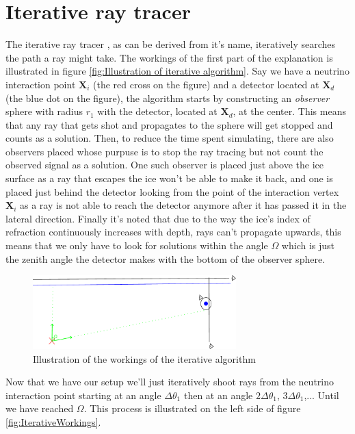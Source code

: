 \documentclass[11pt,a4paper,faculty=we,language=en,doctype=report]{cls/ugent-doc}
\begin{document}
\section{Iterative ray tracer}
\label{sec:Iterative}
The iterative ray tracer \cite{2022icrc.confE1027O}, as can be derived from
it's name, iteratively searches the path a ray might take. The workings of the
first part of the explanation is illustrated in figure \ref{fig:Illustration of
iterative algorithm}.  Say we have a neutrino interaction point $\mathbf{X}_i$
(the red cross on the figure) and a detector located at $\mathbf{X}_d$ (the
blue dot on the figure), the algorithm starts by constructing an
\textit{observer} sphere with radius $r_1$ with the detector, located at $\mathbf{X}_d$, at the
center.  This means that any ray that gets shot and propagates to the sphere
will get stopped and counts as a solution.  Then, to reduce the time spent simulating, there are also observers placed
whose purpuse is to stop the ray tracing but not count the observed signal as a solution.
One such observer is placed 
just above the ice surface as a ray that escapes the ice won't be able to make it back, and one
is placed just behind the detector looking from the point of the interaction vertex $\mathbf{X}_i$ as
a ray is not able to reach the detector anymore after it has passed it in the
lateral direction. Finally it's noted that due to the way the ice's index of refraction
continuously increases with depth, rays can't propagate upwards, this means that we only 
have to look for solutions within the angle $\Omega$ which is just the zenith angle the detector
makes with the bottom of the observer sphere.
\begin{figure}
  \centering
  \includegraphics[width=0.7\textwidth]{algoillu.pdf}
  \caption{Illustration of the workings of the iterative algorithm}
  \label{fig:Illustration of iterative algorithm}
\end{figure}
Now that we have our setup we'll just iteratively shoot rays from the neutrino
interaction point starting at an angle $\Delta \theta_1$ then at an angle
$2\Delta \theta_1$, $3\Delta \theta_1$,... Until we have reached $\Omega$. This
process is illustrated on the left side of figure \ref{fig:IterativeWorkings}.
\end{document}
